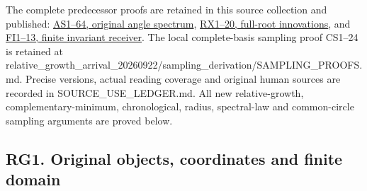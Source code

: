 \documentclass[11pt]{article}
\begin{document}
The complete predecessor proofs are retained in this source collection and published: \href{https://github.com/KokunoYumeto/zeta-function-research-reader/blob/9b7b0bad40b33dc88bba7d8cb1548da1fadbb585/workbenches/splitzero-tandem/continuations/20260921-original-angle-word/ANGLE_PROOFS.md}{AS1--64, original angle spectrum}, \href{https://github.com/KokunoYumeto/zeta-function-research-reader/blob/9b7b0bad40b33dc88bba7d8cb1548da1fadbb585/workbenches/splitzero-tandem/continuations/20260921-original-angle-word/ROOT_INNOVATION_AND_EXTRACTION_PROOFS.md}{RX1--20, full-root innovations}, and \href{https://github.com/KokunoYumeto/zeta-function-research-reader/blob/75256b0237884bdef0074c2ac6310de1ea32ec26/workbenches/splitzero-tandem/continuations/20260921-invariant-collision/FINITE_INVARIANT_PROOFS.md}{FI1--13, finite invariant receiver}. The local complete-basis sampling proof CS1--24 is retained at relative\_growth\_arrival\_20260922/sampling\_derivation/SAMPLING\_PROOFS.md. Precise versions, actual reading coverage and original human sources are recorded in SOURCE\_USE\_LEDGER.md. All new relative-growth, complementary-minimum, chronological, radius, spectral-law and common-circle sampling arguments are proved below.

\subsection{RG1. Original objects, coordinates and finite domain}\label{rg1.-original-objects-coordinates-and-finite-domain}
\end{document}
